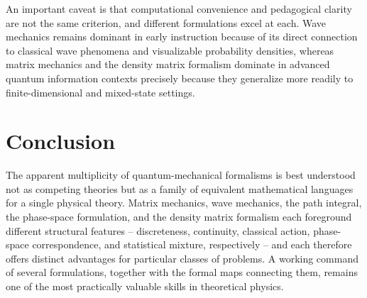 \documentclass[11pt,a4paper]{article}
\begin{document}
An important caveat is that computational convenience and pedagogical clarity are not the same criterion, and different formulations excel at each. Wave mechanics remains dominant in early instruction because of its direct connection to classical wave phenomena and visualizable probability densities, whereas matrix mechanics and the density matrix formalism dominate in advanced quantum information contexts precisely because they generalize more readily to finite-dimensional and mixed-state settings.

\section{Conclusion}

The apparent multiplicity of quantum-mechanical formalisms is best understood not as competing theories but as a family of equivalent mathematical languages for a single physical theory. Matrix mechanics, wave mechanics, the path integral, the phase-space formulation, and the density matrix formalism each foreground different structural features -- discreteness, continuity, classical action, phase-space correspondence, and statistical mixture, respectively -- and each therefore offers distinct advantages for particular classes of problems. A working command of several formulations, together with the formal maps connecting them, remains one of the most practically valuable skills in theoretical physics.
\end{document}
